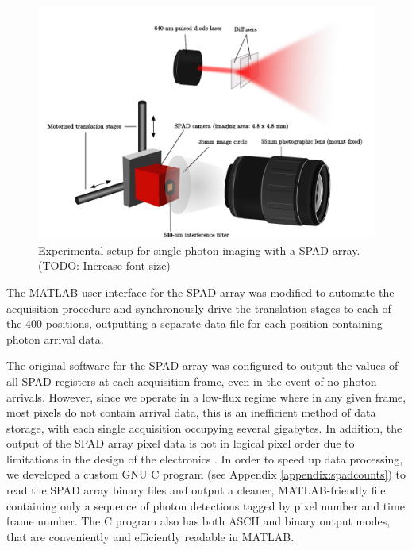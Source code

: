 \begin{figure}[h!]
\centerline{\includegraphics[width=15cm]{figure-first-spad-setup.pdf}}
\caption{Experimental setup for single-photon imaging with a SPAD array. (TODO: Increase font size)}
\label{figure:first-spad-setup}
\end{figure}

The MATLAB user interface for the SPAD array was modified to automate the acquisition procedure and synchronously drive the translation stages to each of the 400 positions, outputting a separate data file for each position containing photon arrival data.

The original software for the SPAD array was configured to output the values of all SPAD registers at each acquisition frame, even in the event of no photon arrivals. However, since we operate in a low-flux regime where in any given frame, most pixels do not contain arrival data, this is an inefficient method of data storage, with each single acquisition occupying several gigabytes. In addition, the output of the SPAD array pixel data is not in logical pixel order due to limitations in the design of the electronics \cite{villa-thesis}. In order to speed up data processing, we developed a custom GNU C program (see Appendix \ref{appendix:spadcounts}) to read the SPAD array binary files and output a cleaner, MATLAB-friendly file containing only a sequence of photon detections tagged by pixel number and time frame number. The C program also has both ASCII and binary output modes, that are conveniently and efficiently readable in MATLAB.

